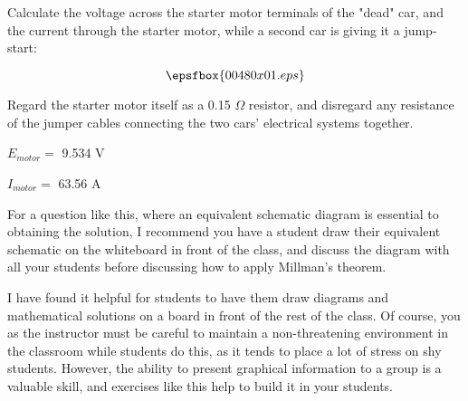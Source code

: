 

Calculate the voltage across the starter motor terminals of the "dead" car, and the current through the starter motor, while a second car is giving it a jump-start:

$$\epsfbox{00480x01.eps}$$

Regard the starter motor itself as a 0.15 $\Omega$ resistor, and disregard any resistance of the jumper cables connecting the two cars' electrical systems together.







$E_{motor} =$ 9.534 V

$I_{motor} =$ 63.56 A







For a question like this, where an equivalent schematic diagram is essential to obtaining the solution, I recommend you have a student draw their equivalent schematic on the whiteboard in front of the class, and discuss the diagram with all your students before discussing how to apply Millman's theorem.

I have found it helpful for students to have them draw diagrams and mathematical solutions on a board in front of the rest of the class.  Of course, you as the instructor must be careful to maintain a non-threatening environment in the classroom while students do this, as it tends to place a lot of stress on shy students.  However, the ability to present graphical information to a group is a valuable skill, and exercises like this help to build it in your students.




